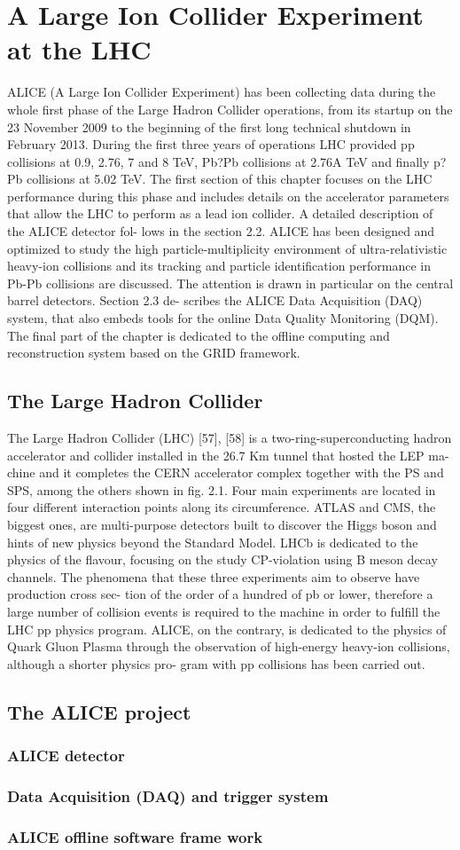 \section{A Large Ion Collider Experiment at the LHC}
ALICE (A Large Ion Collider Experiment) has been collecting data during the whole first phase of the Large Hadron Collider operations, from its startup on the 23 November 2009 to the beginning of the first long technical shutdown in February 2013. During the first three years of operations LHC provided pp collisions at 0.9, 2.76, 7 and 8 TeV, Pb?Pb collisions at 2.76A TeV and finally p?Pb collisions at 5.02 TeV. The first section of this chapter focuses on the LHC performance during this phase and includes details on the accelerator parameters that allow the LHC to perform as a lead ion collider. A detailed description of the ALICE detector fol- lows in the section 2.2. ALICE has been designed and optimized to study the high particle-multiplicity environment of ultra-relativistic heavy-ion collisions and its tracking and particle identification performance in Pb-Pb collisions are discussed. The attention is drawn in particular on the central barrel detectors. Section 2.3 de- scribes the ALICE Data Acquisition (DAQ) system, that also embeds tools for the online Data Quality Monitoring (DQM). The final part of the chapter is dedicated to the offline computing and reconstruction system based on the GRID framework.


\subsection{The Large Hadron Collider}
The Large Hadron Collider (LHC) [57], [58] is a two-ring-superconducting hadron accelerator and collider installed in the 26.7 Km tunnel that hosted the LEP ma- chine and it completes the CERN accelerator complex together with the PS and SPS, among the others shown in fig. 2.1. Four main experiments are located in four different interaction points along its circumference. ATLAS and CMS, the biggest ones, are multi-purpose detectors built to discover the Higgs boson and hints of new physics beyond the Standard Model. LHCb is dedicated to the physics of the flavour, focusing on the study CP-violation using B meson decay channels. The phenomena that these three experiments aim to observe have production cross sec- tion of the order of a hundred of pb or lower, therefore a large number of collision events is required to the machine in order to fulfill the LHC pp physics program. ALICE, on the contrary, is dedicated to the physics of Quark Gluon Plasma through the observation of high-energy heavy-ion collisions, although a shorter physics pro- gram with pp collisions has been carried out.

\subsection{The ALICE project}
\subsubsection{ALICE detector}
\subsubsection{Data Acquisition (DAQ) and trigger system}
\subsubsection{ALICE offline software frame work}
